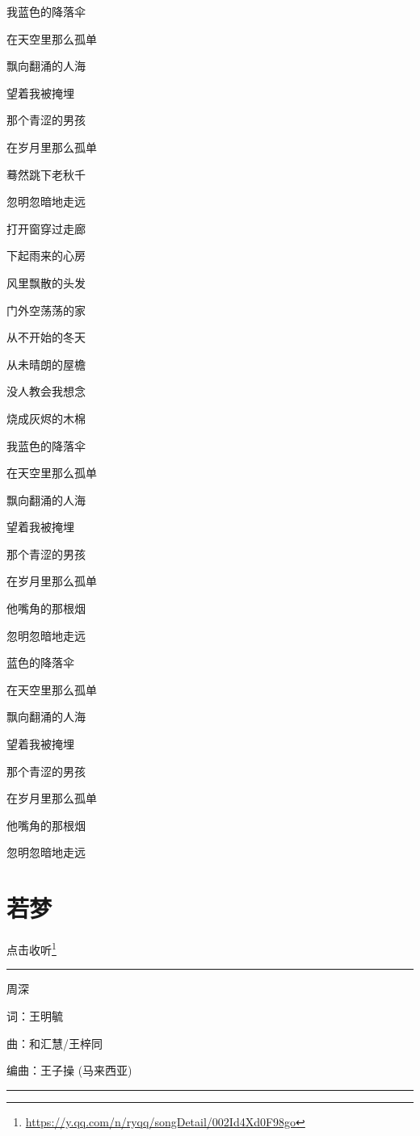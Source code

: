 \documentclass[]{ctexbook}
\renewcommand{\href}[2]{#2\footnote{\url{#1}}}
\begin{document}
我蓝色的降落伞

在天空里那么孤单

飘向翻涌的人海

望着我被掩埋

那个青涩的男孩

在岁月里那么孤单

蓦然跳下老秋千

忽明忽暗地走远

打开窗穿过走廊

下起雨来的心房

风里飘散的头发

门外空荡荡的家

从不开始的冬天

从未晴朗的屋檐

没人教会我想念

烧成灰烬的木棉

我蓝色的降落伞

在天空里那么孤单

飘向翻涌的人海

望着我被掩埋

那个青涩的男孩

在岁月里那么孤单

他嘴角的那根烟

忽明忽暗地走远

蓝色的降落伞

在天空里那么孤单

飘向翻涌的人海

望着我被掩埋

那个青涩的男孩

在岁月里那么孤单

他嘴角的那根烟

忽明忽暗地走远

\section*{若梦}\label{ruomeng}


\href{https://y.qq.com/n/ryqq/songDetail/002Id4Xd0F98go}{点击收听}

\begin{center}\rule{0.5\linewidth}{0.5pt}\end{center}

周深

词：王明毓

曲：和汇慧/王梓同

编曲：王子操 (马来西亚)

\begin{center}\rule{0.5\linewidth}{0.5pt}\end{center}
\end{document}
